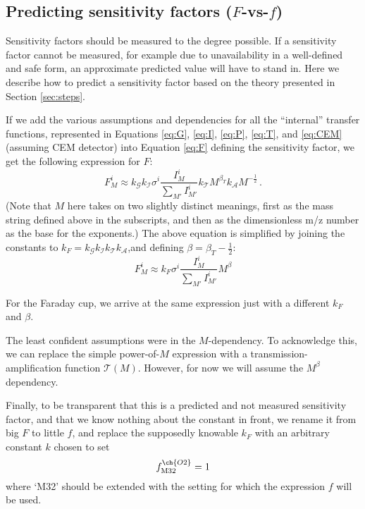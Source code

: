 \documentclass{article}
\begin{document}
\subsection{Predicting sensitivity factors ($F$-vs-$f$)}\label{sec:f}

Sensitivity factors should be measured to the degree possible. If a sensitivity factor cannot be measured, for example due to unavailability in a well-defined and safe form, an approximate predicted value will have to stand in. Here we describe how to predict a sensitivity factor based on the theory presented in Section \ref{sec:steps}.

If we add the various assumptions and dependencies for all the ``internal'' transfer functions, represented in Equations \ref{eq:G}, \ref{eq:I}, \ref{eq:P}, \ref{eq:T}, and \ref{eq:CEM} (assuming CEM detector) into Equation \ref{eq:F} defining the sensitivity factor, we get the following expression for $F$:
\begin{equation}
F^i_M \approx k_\mathcal{G}k_\mathcal{I}\sigma^i\frac{I_M^i}{\sum_{M'}I^i_{M'}}k_\mathcal{T}M^{\beta_T}k_\mathcal{A}M^{-\frac{1}{2}}\,.
\end{equation}
(Note that $M$ here takes on two slightly distinct meanings, first as the mass string defined above in the subscripts, and then as the dimensionless m/z number as the base for the exponents.) The above equation is simplified by joining the constants to $k_F=k_\mathcal{G}k_\mathcal{I}k_\mathcal{T}k_\mathcal{A}$,and defining $\beta = \beta_T-\frac{1}{2}$:
\begin{equation}
F^i_M \approx k_F\sigma^i\frac{I_M^i}{\sum_{M'}I^i_{M'}}M^{\beta}
\end{equation}

For the Faraday cup, we arrive at the same expression just with a different $k_F$ and $\beta$.

The least confident assumptions were in the $M$-dependency. To acknowledge this, we can replace the simple power-of-$M$ expression with a transmission-amplification function $\mathcal{T}(M)$. However, for now we will assume the $M^\beta$ dependency.

Finally, to be transparent that this is a predicted and not measured sensitivity factor, and that we know nothing about the constant in front, we rename it from big $F$ to little $f$, and replace the supposedly knowable $k_F$ with an arbitrary constant $k$ chosen to set
\begin{equation}
f_\text{M32}^{\ch{O2}}=1 \label{eq:k}
\end{equation}
where `M32' should be extended with the setting for which the expression $f$ will be used.
\end{document}
